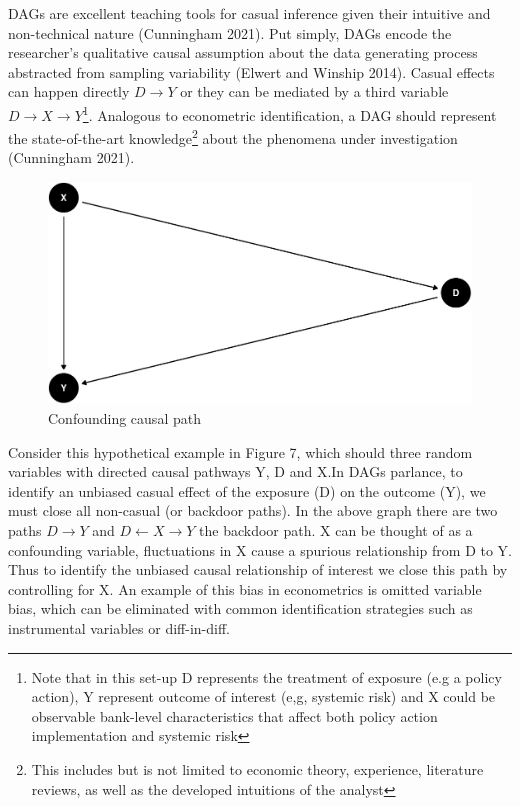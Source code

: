 \documentclass[
  10pt,
]{article}
\begin{document}
DAGs are excellent teaching tools for casual inference given their
intuitive and non-technical nature (Cunningham 2021). Put simply, DAGs
encode the researcher's qualitative causal assumption about the data
generating process abstracted from sampling variability (Elwert and
Winship 2014). Casual effects can happen directly \(D \to Y\) or they
can be mediated by a third variable \(D \to X \to Y\)\footnote{Note that
  in this set-up D represents the treatment of exposure (e.g a policy
  action), Y represent outcome of interest (e,g, systemic risk) and X
  could be observable bank-level characteristics that affect both policy
  action implementation and systemic risk}. Analogous to econometric
identification, a DAG should represent the state-of-the-art
knowledge\footnote{This includes but is not limited to economic theory,
  experience, literature reviews, as well as the developed intuitions of
  the analyst} about the phenomena under investigation (Cunningham
2021).

\begin{figure}[H]
\includegraphics{figures/paper-unnamed-chunk-2-1} \caption{Confounding causal path}\label{fig:unnamed-chunk-2}
\end{figure}

Consider this hypothetical example in Figure 7, which should three
random variables with directed causal pathways Y, D and X.In DAGs
parlance, to identify an unbiased casual effect of the exposure (D) on
the outcome (Y), we must close all non-casual (or backdoor paths). In
the above graph there are two paths \(D \rightarrow Y\) and
\(D \leftarrow X \rightarrow Y\) the backdoor path. X can be thought of
as a confounding variable, fluctuations in X cause a spurious
relationship from D to Y. Thus to identify the unbiased causal
relationship of interest we close this path by controlling for X. An
example of this bias in econometrics is omitted variable bias, which can
be eliminated with common identification strategies such as instrumental
variables or diff-in-diff.
\end{document}
